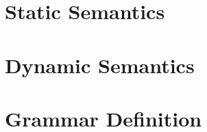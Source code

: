\documentclass[11pt]{article}%
\begin{document}
%

%

\section{Static Semantics}
\ottdefnsTypes%

\section{Dynamic Semantics}
\ottdefnsOpXXSem%


\clearpage%


\clearpage%

\section{Grammar Definition}
\ottgrammar%
\clearpage%
\end{document}
